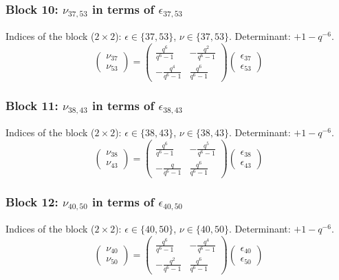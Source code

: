 \subsubsection{Block 10: $\nu_{37, 53}$ in terms of $\epsilon_{37, 53}$}
Indices of the block ($2\times 2$): $\epsilon \in \{37, 53\}$, $\nu \in \{37, 53\}$.
Determinant: $+1-q^{-6}$.
\[
\begin{pmatrix}
\nu_{37} \\
\nu_{53}
\end{pmatrix}
=
\begin{pmatrix}
\frac{q^{6}}{q^{6}-1} & -\frac{q^{2}}{q^{6}-1} \\
-\frac{q^{4}}{q^{6}-1} & \frac{q^{6}}{q^{6}-1}
\end{pmatrix}
\begin{pmatrix}
\epsilon_{37} \\
\epsilon_{53}
\end{pmatrix}
\]

\subsubsection{Block 11: $\nu_{38, 43}$ in terms of $\epsilon_{38, 43}$}
Indices of the block ($2\times 2$): $\epsilon \in \{38, 43\}$, $\nu \in \{38, 43\}$.
Determinant: $+1-q^{-6}$.
\[
\begin{pmatrix}
\nu_{38} \\
\nu_{43}
\end{pmatrix}
=
\begin{pmatrix}
\frac{q^{6}}{q^{6}-1} & -\frac{q^{5}}{q^{6}-1} \\
-\frac{q}{q^{6}-1} & \frac{q^{6}}{q^{6}-1}
\end{pmatrix}
\begin{pmatrix}
\epsilon_{38} \\
\epsilon_{43}
\end{pmatrix}
\]

\subsubsection{Block 12: $\nu_{40, 50}$ in terms of $\epsilon_{40, 50}$}
Indices of the block ($2\times 2$): $\epsilon \in \{40, 50\}$, $\nu \in \{40, 50\}$.
Determinant: $+1-q^{-6}$.
\[
\begin{pmatrix}
\nu_{40} \\
\nu_{50}
\end{pmatrix}
=
\begin{pmatrix}
\frac{q^{6}}{q^{6}-1} & -\frac{q^{4}}{q^{6}-1} \\
-\frac{q^{2}}{q^{6}-1} & \frac{q^{6}}{q^{6}-1}
\end{pmatrix}
\begin{pmatrix}
\epsilon_{40} \\
\epsilon_{50}
\end{pmatrix}
\]

